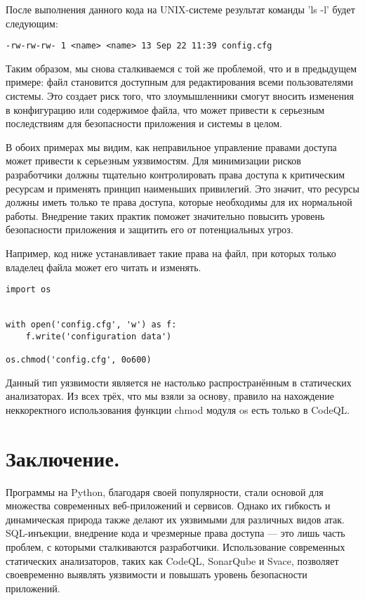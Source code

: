 \documentclass[a4paper,12pt]{article} %
\begin{document}
				\par После выполнения данного кода на UNIX-системе результат команды 'ls -l' будет следующим:

				\begin{lstlisting}
-rw-rw-rw- 1 <name> <name> 13 Sep 22 11:39 config.cfg
                \end{lstlisting}

				\par Таким образом, мы снова сталкиваемся с той же проблемой, что и в предыдущем примере: файл становится доступным для редактирования всеми пользователями системы. Это создает риск того, что злоумышленники смогут вносить изменения в конфигурацию или содержимое файла, что может привести к серьезным последствиям для безопасности приложения и системы в целом.

			\par В обоих примерах мы видим, как неправильное управление правами доступа может привести к серьезным уязвимостям. Для минимизации рисков разработчики должны тщательно контролировать права доступа к критическим ресурсам и применять принцип наименьших привилегий. Это значит, что ресурсы должны иметь только те права доступа, которые необходимы для их нормальной работы. Внедрение таких практик поможет значительно повысить уровень безопасности приложения и защитить его от потенциальных угроз.

			\par Например, код ниже устанавливает такие права на файл, при которых только владелец файла может его читать и изменять.

			\begin{lstlisting}[style=pythonstyle]
import os


with open('config.cfg', 'w') as f:
    f.write('configuration data')

os.chmod('config.cfg', 0o600)
			\end{lstlisting}

			\par Данный тип уязвимости является не настолько распространённым в статических анализаторах. Из всех трёх, что мы взяли за основу, правило на нахождение неккоректного использования функции chmod модуля os есть только в CodeQL.

	\section{Заключение.}
		Программы на Python, благодаря своей популярности, стали основой для множества современных веб-приложений и сервисов. Однако их гибкость и динамическая природа также делают их уязвимыми для различных видов атак. SQL-инъекции, внедрение кода и чрезмерные права доступа — это лишь часть проблем, с которыми сталкиваются разработчики. Использование современных статических анализаторов, таких как CodeQL, SonarQube и Svace, позволяет своевременно выявлять уязвимости и повышать уровень безопасности приложений.
\end{document}
